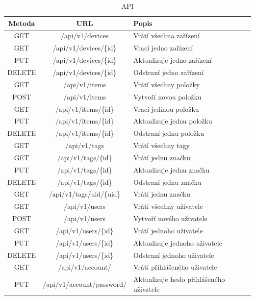 \documentclass[czech,BP]{thesiskiv}
\begin{document}
\begin{table}[ht]
\centering
\begin{tabular}{ c | c | p{6cm}}
\textbf{Metoda} & \textbf{URL} & \textbf{Popis} \\ \hline\hline
 	
GET & /api/v1/devices & Vrátí všechna zařízení \\ \hline  
GET & /api/v1/devices/\{id\} & Vrací jedno zařízení \\ \hline
PUT & /api/v1/devices/\{id\} & Aktualizuje jedno zařízení \\ \hline
DELETE & /api/v1/devices/\{id\} & Odstraní jedno zařízení  \\ \hline

GET & /api/v1/items & Vrátí všechny položky \\ \hline
POST & /api/v1/items & Vytvoří novou položku \\ \hline
GET & /api/v1/items/\{id\} & Vrací jedinou položku \\ \hline
PUT & /api/v1/items/\{id\} & Aktualizuje jednu položku \\ \hline
DELETE & /api/v1/items/\{id\} & Odstraní jednu položku \\ \hline

GET & /api/v1/tags & Vrátí všechny tagy  \\ \hline
GET & /api/v1/tags/\{id\} & Vrátí jednu značku \\ \hline
PUT & /api/v1/tags/\{id\} & Aktualizuje jednu značku \\ \hline
DELETE & /api/v1/tags/\{id\} & Odstraní jednu značku \\ \hline
GET & /api/v1/tags/uid/\{uid\} & Vrátí jednu značku \\ \hline

GET & /api/v1/users & Vrátí všechny uživatele \\ \hline
POST & /api/v1/users & Vytvoří nového uživatele \\ \hline
GET & /api/v1/users/\{id\} & Vrátí jednoho uživatele \\ \hline
PUT & /api/v1/users/\{id\} & Aktualizuje jednoho uživatele \\ \hline
DELETE & /api/v1/users/\{id\} & Odstraní jednoho uživatele \\ \hline

GET & /api/v1/account/ & Vrátí přihlášeného uživatele  \\ \hline
PUT & /api/v1/account/password/ & Aktualizuje heslo přihlášeného uživatele \\ \hline    
\end{tabular}
\caption{API}
\label{table:api}
\end{table}
\end{document}
